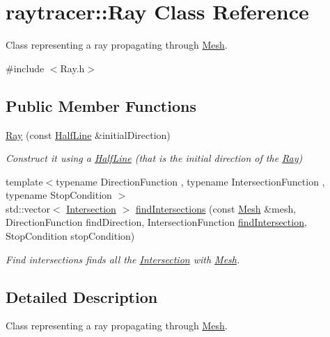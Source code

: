 \hypertarget{classraytracer_1_1Ray}{}\section{raytracer\+:\+:Ray Class Reference}
\label{classraytracer_1_1Ray}


Class representing a ray propagating through \hyperlink{classraytracer_1_1Mesh}{Mesh}.  




{\ttfamily \#include $<$Ray.\+h$>$}

\subsection*{Public Member Functions}
\begin{DoxyCompactItemize}
\item 
\hyperlink{classraytracer_1_1Ray_aa2a51f7caa322193c4b458ba960920f7}{Ray} (const \hyperlink{structraytracer_1_1HalfLine}{Half\+Line} \&initial\+Direction)
\begin{DoxyCompactList}\small\item\em Construct it using a \hyperlink{structraytracer_1_1HalfLine}{Half\+Line} (that is the initial direction of the \hyperlink{classraytracer_1_1Ray}{Ray}) \end{DoxyCompactList}\item 
{\footnotesize template$<$typename Direction\+Function , typename Intersection\+Function , typename Stop\+Condition $>$ }\\std\+::vector$<$ \hyperlink{structraytracer_1_1Intersection}{Intersection} $>$ \hyperlink{classraytracer_1_1Ray_a9ebcb3641ec730e5b94452833b69c68d}{find\+Intersections} (const \hyperlink{classraytracer_1_1Mesh}{Mesh} \&mesh, Direction\+Function find\+Direction, Intersection\+Function \hyperlink{namespaceraytracer_ae44c3032cf96db5f4ba9c07f12c9a207}{find\+Intersection}, Stop\+Condition stop\+Condition)
\begin{DoxyCompactList}\small\item\em Find intersections finds all the \hyperlink{structraytracer_1_1Intersection}{Intersection} with \hyperlink{classraytracer_1_1Mesh}{Mesh}. \end{DoxyCompactList}\end{DoxyCompactItemize}


\subsection{Detailed Description}
Class representing a ray propagating through \hyperlink{classraytracer_1_1Mesh}{Mesh}. 

